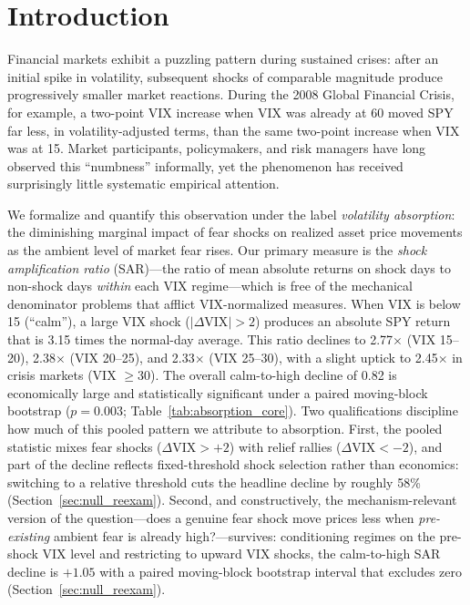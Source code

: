 \documentclass[12pt,a4paper]{article}
\begin{document}
\newpage
\tableofcontents
\newpage

\section{Introduction}
\label{sec:intro}

Financial markets exhibit a puzzling pattern during sustained crises: after an initial spike in volatility, subsequent shocks of comparable magnitude produce progressively smaller market reactions. During the 2008 Global Financial Crisis, for example, a two-point VIX increase when VIX was already at 60 moved SPY far less, in volatility-adjusted terms, than the same two-point increase when VIX was at 15. Market participants, policymakers, and risk managers have long observed this ``numbness'' informally, yet the phenomenon has received surprisingly little systematic empirical attention.

We formalize and quantify this observation under the label \textit{volatility absorption}: the diminishing marginal impact of fear shocks on realized asset price movements as the ambient level of market fear rises. Our primary measure is the \textit{shock amplification ratio} (SAR)---the ratio of mean absolute returns on shock days to non-shock days \textit{within} each VIX regime---which is free of the mechanical denominator problems that afflict VIX-normalized measures. When VIX is below 15 (``calm''), a large VIX shock ($|\Delta\text{VIX}| > 2$) produces an absolute SPY return that is 3.15 times the normal-day average. This ratio declines to 2.77$\times$ (VIX 15--20), 2.38$\times$ (VIX 20--25), and 2.33$\times$ (VIX 25--30), with a slight uptick to 2.45$\times$ in crisis markets (VIX $\geq 30$). The overall calm-to-high decline of 0.82 is economically large and statistically significant under a paired moving-block bootstrap ($p = 0.003$; Table~\ref{tab:absorption_core}). Two qualifications discipline how much of this pooled pattern we attribute to absorption. First, the pooled statistic mixes fear shocks ($\Delta\text{VIX} > +2$) with relief rallies ($\Delta\text{VIX} < -2$), and part of the decline reflects fixed-threshold shock selection rather than economics: switching to a relative threshold cuts the headline decline by roughly 58\% (Section~\ref{sec:null_reexam}). Second, and constructively, the mechanism-relevant version of the question---does a genuine fear shock move prices less when \textit{pre-existing} ambient fear is already high?---survives: conditioning regimes on the pre-shock VIX level and restricting to upward VIX shocks, the calm-to-high SAR decline is $+1.05$ with a paired moving-block bootstrap interval that excludes zero (Section~\ref{sec:null_reexam}).
\end{document}
